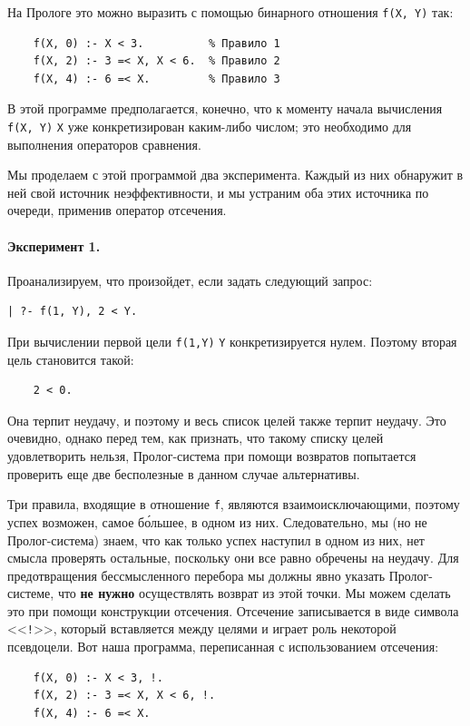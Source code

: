 \documentclass[12pt, openany, twoside]{book} %
\begin{document}
\noindent На Прологе это можно выразить с помощью бинарного отношения
\texttt{f(X, Y)} так:
{\tt \begin{verbatim}
    f(X, 0) :- X < 3.          % Правило 1
    f(X, 2) :- 3 =< X, X < 6.  % Правило 2
    f(X, 4) :- 6 =< X.         % Правило 3
\end{verbatim}}

В этой программе предполагается, конечно, что к моменту начала вычисления {\tt f(X, Y)} {\tt X} уже конкретизирован каким-либо числом; это необходимо для выполнения операторов сравнения.

Мы проделаем с этой программой два эксперимента. Каждый из них обнаружит в ней свой источник неэффективности, и мы устраним оба этих источника по очереди, применив оператор отсечения.

\paragraph{Эксперимент 1.} Проанализируем, что произойдет, если задать следующий запрос:
{\tt \begin{verbatim}
| ?- f(1, Y), 2 < Y.
\end{verbatim}}

При вычислении первой цели {\tt f(1,Y)} {\tt Y} конкретизируется нулем. Поэтому вторая цель становится такой:
{\tt \begin{verbatim}
    2 < 0.
\end{verbatim}}
\noindent Она терпит неудачу, и поэтому и весь список целей также терпит неудачу. Это очевидно, однако перед тем, как признать, что такому списку целей удовлетворить нельзя, Пролог-система при помощи возвратов попытается проверить еще две бесполезные в данном случае альтернативы.

Три правила, входящие в отношение {\tt f}, являются взаимоисключающими, поэтому успех возможен, самое б\'{о}льшее, в одном из них. Следовательно, мы (но не Пролог-система) знаем, что как только успех наступил в одном из них, нет смысла проверять остальные, поскольку они все равно обречены на неудачу. Для предотвращения бессмысленного перебора мы должны явно указать Пролог-системе, что {\bf не нужно} осуществлять возврат из этой точки. Мы можем сделать это при помощи конструкции отсечения. Отсечение записывается в виде символа <<{\tt !}>>, который вставляется между целями и играет роль некоторой псевдоцели. Вот наша программа, переписанная с использованием отсечения:

{\tt \begin{verbatim}
    f(X, 0) :- X < 3, !.
    f(X, 2) :- 3 =< X, X < 6, !.
    f(X, 4) :- 6 =< X.
\end{verbatim}}
\end{document}
